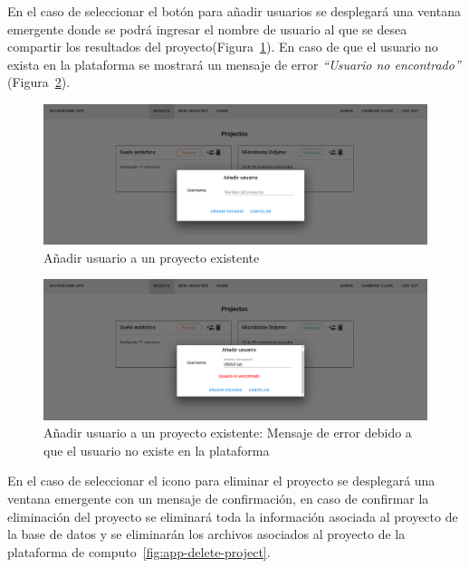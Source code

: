 En el caso de seleccionar el botón para añadir usuarios se desplegará una ventana emergente donde se podrá ingresar el nombre de usuario al que se desea compartir los resultados del proyecto(Figura~\ref{fig:app-add-project}). 
En caso de que el usuario no exista en la plataforma se mostrará un mensaje de error \textit{“Usuario no encontrado”} (Figura~\ref{fig:app-add-project-invalid-usar}).
\begin{figure}[H]
        \centering
        \includegraphics[width=\textwidth]{images/app/addUser.png}
        \caption{Añadir usuario a un proyecto existente}
        \label{fig:app-add-project}

\end{figure}

\begin{figure}[H]
    \centering
    \includegraphics[width=\textwidth]{images/app/addUser_notFound.png}
    \caption{Añadir usuario a un proyecto existente: Mensaje de error debido a que el usuario no existe en la plataforma}
    \label{fig:app-add-project-invalid-usar}

\end{figure}

En el caso de seleccionar el icono para eliminar el proyecto se desplegará una ventana emergente con un mensaje de confirmación, en caso de confirmar la eliminación del proyecto se eliminará toda la información asociada al proyecto de la base de datos y se eliminarán los archivos asociados al proyecto de la plataforma de computo~\ref{fig:app-delete-project}.

